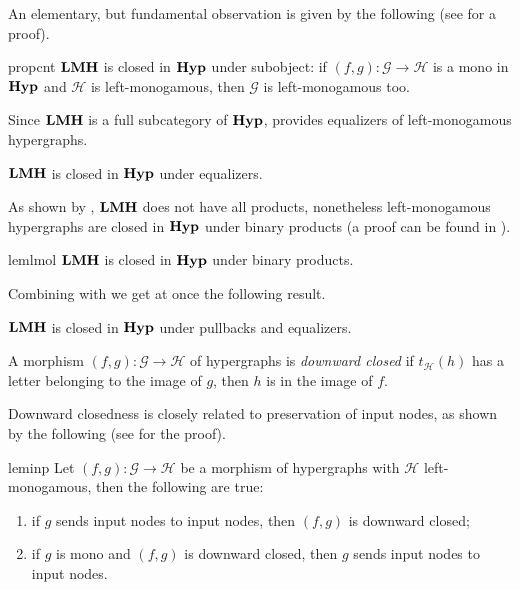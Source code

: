 \documentclass[3p]{elsarticle}
\newcommand{\catname}[1]{\textbf{\textup{#1}}}
\newcommand{\lmo}{\catname{LMH}}
\newcommand{\hyp}{\catname{Hyp}}
\theoremstyle{remark}
\theoremstyle{definition}
\begin{document}
An elementary, but fundamental observation is given by the following (see  for a proof).


\begin{restatable}{prop}{cnt}\label{prop:count}
	$\lmo$ is closed in $\hyp$ under subobject: if $(f,g)\colon \mathcal{G}\to \mathcal{H}$ is a mono in $\hyp$ and $\mathcal{H}$ is left-monogamous, then $\mathcal{G}$ is left-monogamous too.
\end{restatable}

Since $\lmo$ is a full subcategory of $\hyp$, 
 provides equalizers of left-monogamous hypergraphs.
\begin{cor}\label{cor:eq}
	$\lmo$ is closed in $\hyp$ under equalizers.
\end{cor}

As shown by , $\lmo$ does not have all products, nonetheless left-monogamous hypergraphs are closed in $\hyp$ under binary products (a proof can be found in ).

\begin{restatable}{lem}{lmol}\label{lem:pro}
	$\lmo$ is closed in $\hyp$ under binary products.
\end{restatable}

Combining  with  we get at once the following result.

\begin{cor}	$\lmo$ is closed in $\hyp$ under pullbacks and equalizers.
\end{cor}


\begin{defi}
A morphism $(f,g)\colon \mathcal{G}\to \mathcal{H}$ of hypergraphs  is \emph{downward closed} if  $t_{\mathcal{H}}(h)$ has a letter belonging to the image of $g$, then $h$ is in the image of $f$. 
\end{defi}

Downward closedness is closely related to preservation of input nodes, as shown by the following (see  for the proof).

\begin{restatable}{lem}{inp}\label{lem:inp}
	Let $(f,g)\colon \mathcal{G}\to \mathcal{H}$ be a morphism of hypergraphs with $\mathcal{H}$ left-monogamous, then the following are true:
	\begin{enumerate}
		\item if $g$ sends input nodes to input nodes, then $(f,g)$ is downward closed; 
		\item if $g$ is mono and $(f,g)$ is downward closed, then $g$ sends input nodes to input nodes.
	\end{enumerate}
\end{restatable}
\end{document}
